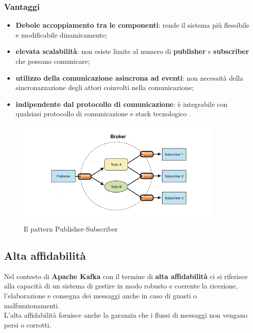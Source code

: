 \subsubsection{Vantaggi}
\begin{itemize}
    \item \textbf{Debole accoppiamento tra le componenti}:  rende il sistema più flessibile e modificabile dinamicamente;
    \item \textbf{elevata scalabilità}: non esiste limite al numero di \textbf{publisher} e \textbf{subscriber} che possano comunicare;
    \item \textbf{utilizzo della comunicazione asincrona ad eventi}: non necessità della sincronazzazione degli attori coinvolti nella comunicazione;
    \item \textbf{indipendente dal protocollo di comunicazione}: è integrabile con qualsiasi protocollo di comunicazione e stack tecnologico \cite{site:Pattern_publisher_subscriber}.
\end{itemize}
\begin{figure}[h]
    \centering
    \includegraphics[width=0.9\textwidth]{images/componenti/ps-model.png}
    \caption{Il pattern Publisher-Subscriber}
    \label{fig:publisher_subscriber}
\end{figure}
\pagebreak
\subsection{Alta affidabilità}\label{sec:alta_affidabilita}
Nel contesto di \textbf{Apache Kafka} con il termine di \textbf{alta affidabilità} ci si riferisce alla capacità di un sistema di gestire in modo
robusto e coerente la ricezione, l'elaborazione e consegna dei messaggi anche in caso di guasti o malfunzionamenti.\\
L'alta affidabilità fornisce anche la garanzia che i flussi di messaggi non vengano persi o corrotti.
